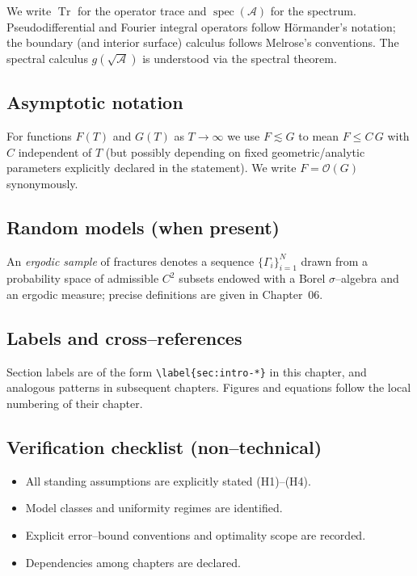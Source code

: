 We write $\operatorname{Tr}$ for the operator trace and
$\operatorname{spec}(\mathcal{A})$ for the spectrum. Pseudodifferential and
Fourier integral operators follow H\"ormander’s notation; the boundary (and
interior surface) calculus follows Melrose’s conventions. The spectral
calculus $g(\sqrt{\mathcal{A}})$ is understood via the spectral theorem.

\subsection{Asymptotic notation}
\label{sub:intro-asymptotic}

For functions $F(T)$ and $G(T)$ as $T\to\infty$ we use
$F\lesssim G$ to mean $F\le C\,G$ with $C$ independent of $T$ (but possibly
depending on fixed geometric/analytic parameters explicitly declared in the
statement). We write $F=\mathcal{O}(G)$ synonymously.

\subsection{Random models (when present)}
\label{sub:intro-random}

An \emph{ergodic sample} of fractures denotes a sequence
$\{\Gamma_i\}_{i=1}^N$ drawn from a probability space of admissible $C^2$
subsets endowed with a Borel $\sigma$–algebra and an ergodic measure;
precise definitions are given in Chapter~06.

\subsection{Labels and cross–references}
\label{sub:intro-labels}

Section labels are of the form \verb|\label{sec:intro-*}| in this chapter,
and analogous patterns in subsequent chapters. Figures and equations follow
the local numbering of their chapter.

\subsection{Verification checklist (non–technical)}
\label{sub:intro-verification}

\begin{itemize}
  \item All standing assumptions are explicitly stated (H1)–(H4).
  \item Model classes and uniformity regimes are identified.
  \item Explicit error–bound conventions and optimality scope are recorded.
  \item Dependencies among chapters are declared.
\end{itemize}
